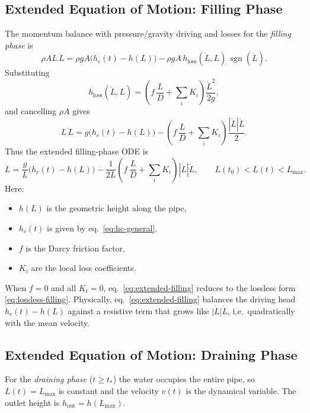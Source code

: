 \documentclass[11pt]{article}
\begin{document}
\subsection{Extended Equation of Motion: Filling Phase}

The momentum balance with pressure/gravity driving and losses for the
\emph{filling phase} is
\[
\rho A L\,\ddot L
= \rho g A\bigl(h_c(t) - h(L)\bigr)
  - \rho g A\,h_{\text{loss}}(\dot L,L)\,\operatorname{sgn}(\dot L).
\]
Substituting
\[
h_{\text{loss}}(\dot L,L)
= \left(
    f\,\frac{L}{D}
    + \sum_i K_i
  \right)\frac{\dot L^2}{2g},
\]
and cancelling $\rho A$ gives
\[
L\,\ddot L
= g\bigl(h_c(t) - h(L)\bigr)
  - \left(
      f\,\frac{L}{D}
      + \sum_i K_i
    \right)\frac{|\dot L|\dot L}{2}.
\]
Thus the extended filling-phase ODE is
\begin{equation}
\ddot L
= \frac{g}{L}\bigl(h_c(t) - h(L)\bigr)
  - \frac{1}{2L}
    \left(
      f\,\frac{L}{D}
      + \sum_i K_i
    \right)|\dot L|\dot L,
\qquad L(t_0) < L(t) < L_{\max}.
\label{eq:extended-filling}
\end{equation}
Here:
\begin{itemize}
  \item $h(L)$ is the geometric height along the pipe,
  \item $h_c(t)$ is given by eq.~\eqref{eq:hc-general},
  \item $f$ is the Darcy friction factor,
  \item $K_i$ are the local loss coefficients.
\end{itemize}
When $f=0$ and all $K_i=0$, eq.~\eqref{eq:extended-filling} reduces to the
lossless form \eqref{eq:lossless-filling}.  Physically,
eq.~\eqref{eq:extended-filling} balances the driving head $h_c(t)-h(L)$ against
a resistive term that grows like $\lvert\dot L\rvert\dot L$, i.e.\ quadratically
with the mean velocity.

\subsection{Extended Equation of Motion: Draining Phase}

For the \emph{draining phase} ($t \ge t_\ast$) the water occupies the entire
pipe, so $L(t) = L_{\max}$ is constant and the velocity $v(t)$ is the dynamical
variable. The outlet height is $h_{\text{out}} = h(L_{\max})$.
\end{document}
